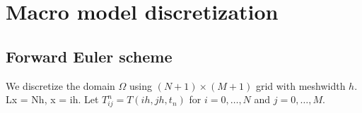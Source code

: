 \documentclass[a4paper,12pt]{article}
\begin{document}
%
%
%
%

\section{Macro model discretization}
\subsection{Forward Euler scheme}
We discretize the domain $\Omega$ using $(N+1) \times (M+1)$ grid with meshwidth $h$. Lx = Nh, x = ih.
Let $T_{ij}^n=T(ih, jh, t_n )$ for $i=0,\dots,N$ and $j = 0, \dots, M$.
\end{document}
